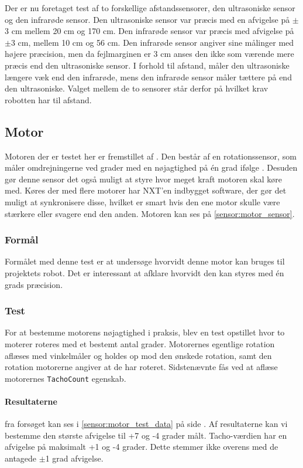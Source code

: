 Der er nu foretaget test af to forskellige afstandssensorer, den ultrasoniske sensor og den infrarøde sensor. 
Den ultrasoniske sensor var præcis med en afvigelse på $\pm$3 cm mellem 20 cm og 170 cm.
Den infrarøde sensor var præcis med afvigelse på $\pm$3 cm, mellem 10 cm og 56 cm.
Den infrarøde sensor angiver sine målinger med højere præcision, men da fejlmarginen er 3 cm anses den ikke som værende mere præcis end den ultrasoniske sensor.
I forhold til afstand, måler den ultrasoniske længere væk end den infrarøde, mens den infrarøde sensor måler tættere på end den ultrasoniske.
Valget mellem de to sensorer står derfor på hvilket krav robotten har til afstand.

\subsection{Motor}\label{sensorer:motorer}
Motoren der er testet her er fremstillet af \lego.
Den består af en rotationssensor, som måler omdrejningerne ved grader med en nøjagtighed på \'en grad ifølge \lego. 
Desuden gør denne sensor det også muligt at styre hvor meget kraft motoren skal køre med.
Køres der med flere motorer har NXT'en indbygget software, der gør det muligt at synkronisere disse, hvilket er smart hvis den ene motor skulle være stærkere eller svagere end den anden.\cite{tikNXT}
Motoren kan ses på \cref{sensor:motor_sensor}.

\subsubsection{Formål}
Formålet med denne test er at undersøge hvorvidt denne motor kan bruges til projektets robot.
Det er interessant at afklare hvorvidt den kan styres med \'en grads præcision.

\subsubsection{Test}
For at bestemme motorens nøjagtighed i praksis, blev en test opstillet hvor to moterer roteres med et bestemt antal grader.
Motorernes egentlige rotation aflæses med vinkelmåler og holdes op mod den ønskede rotation, samt den rotation motorerne angiver at de har roteret.
Sidstenævnte fås ved at aflæse motorernes \lstinline[style=csharp]!TachoCount! egenskab.

\paragraph{Resultaterne} fra forsøget kan ses i \cref{sensor:motor_test_data} på side \pageref{sensor:motor_test_data}.
Af resultaterne kan vi bestemme den største afvigelse til +7 og -4 grader målt.
Tacho-værdien har en afvigelse på maksimalt +1 og -4 grader.
Dette stemmer ikke overens med de antagede $\pm$1 grad afvigelse.

